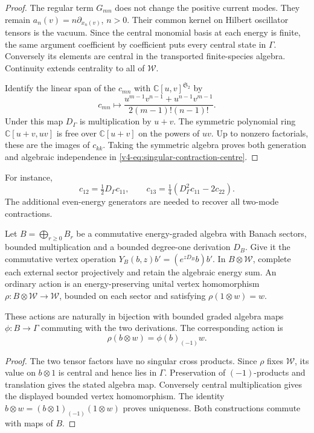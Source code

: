 \begin{proof}
The regular term \(G_{mn}\) does not change
the positive current modes. They remain
\(a_n(v)=n\partial_{x_n(v)}\), \(n>0\).
Their common kernel on Hilbert oscillator
tensors is the vacuum. Since the central
monomial basis at each energy is finite,
the same argument coefficient by coefficient
puts every central state in \(\Gamma\).
Conversely its elements are central in
the transported finite-species algebra.
Continuity extends centrality to all of
\(\mathcal W\).

Identify the linear span of the \(c_{mn}\)
with \(\mathbb C[u,v]^{\mathfrak S_2}\) by
\[
 c_{mn}\longmapsto
 \frac{u^{m-1}v^{n-1}+u^{n-1}v^{m-1}}
      {2(m-1)!(n-1)!}.
\]
Under this map \(D_\Gamma\) is multiplication
by \(u+v\). The symmetric polynomial ring
\(\mathbb C[u+v,uv]\) is free over
\(\mathbb C[u+v]\) on the powers of \(uv\).
Up to nonzero factorials, these are the
images of \(c_{kk}\). Taking the symmetric
algebra proves both generation and
algebraic independence in
\eqref{v4-eq:singular-contraction-centre}.
\end{proof}

For instance,
\[
 c_{12}=\tfrac12D_\Gamma c_{11},\qquad
 c_{13}=\tfrac14(D_\Gamma^2c_{11}-2c_{22}).
\]
The additional even-energy generators are
needed to recover all two-mode contractions.

Let \(B=\bigoplus_{r\geq0}B_r\) be a
commutative energy-graded algebra with Banach
sectors, bounded multiplication and a bounded
degree-one derivation \(D_B\). Give it the
commutative vertex operation
\(Y_B(b,z)b'=(e^{zD_B}b)b'\).
In \(B\otimes\mathcal W\), complete each
external sector projectively and retain
the algebraic energy sum. An ordinary
action is an energy-preserving unital
vertex homomorphism
\(\rho:B\otimes\mathcal W\to\mathcal W\),
bounded on each sector and satisfying
\(\rho(1\otimes w)=w\).

\begin{proposition}\label{v4-prop:singular-central-actions}
These actions are naturally in bijection
with bounded graded algebra maps
\(\phi:B\to\Gamma\) commuting with the
two derivations. The corresponding action is
\[
                       \rho(b\otimes w)=\phi(b)_{(-1)}w.
\]
\end{proposition}

\begin{proof}
The two tensor factors have no singular
cross products. Since \(\rho\) fixes
\(\mathcal W\), its value on \(b\otimes1\)
is central and hence lies in \(\Gamma\).
Preservation of \((-1)\)-products and
translation gives the stated algebra map.
Conversely central multiplication gives
the displayed bounded vertex homomorphism.
The identity
\(b\otimes w=(b\otimes1)_{(-1)}(1\otimes w)\)
proves uniqueness. Both constructions
commute with maps of \(B\).
\end{proof}

